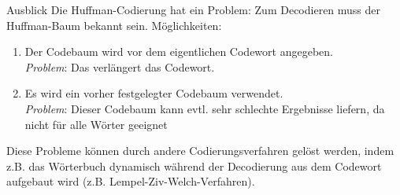 \begin{frame}{Ausblick}
	Die Huffman-Codierung hat ein Problem: Zum Decodieren muss der Huffman-Baum bekannt sein. Möglichkeiten:
	\begin{enumerate}
		\item Der Codebaum wird vor dem eigentlichen Codewort angegeben.\\ 
		\emph{Problem}: Das verlängert das Codewort.
		\item Es wird ein vorher festgelegter Codebaum verwendet.\\
		 \emph{Problem}: Dieser Codebaum kann evtl. sehr schlechte Ergebnisse liefern, da nicht für alle Wörter geeignet
	\end{enumerate}

	Diese Probleme können durch andere Codierungsverfahren gelöst werden, indem z.B. das Wörterbuch dynamisch während der Decodierung aus dem Codewort aufgebaut wird (z.B. Lempel-Ziv-Welch-Verfahren).
\end{frame}


